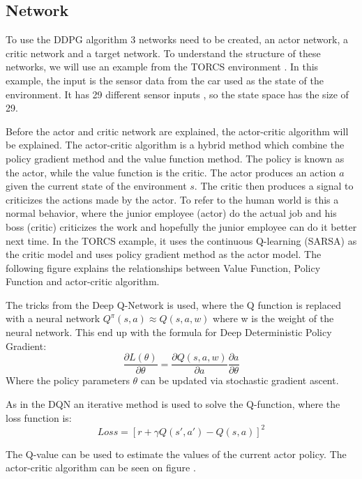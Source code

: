 \subsection{Network}
To use the DDPG algorithm 3 networks need to be created, an actor network, a critic network and a target network. To understand the structure of these networks, we will use an example from the TORCS environment \cite{DDPG_Torcs}. In this example, the input is the sensor data from the car used as the state of the environment. It has 29 different sensor inputs \cite{Data_from_Torcs}, so the state space has the size of 29.  

Before the actor and critic network are explained, the actor-critic algorithm will be explained. The actor-critic algorithm is a hybrid method which combine the policy gradient method and the value function method. The policy is known as the actor, while the value function is the critic. The actor produces an action $a$ given the current state of the environment $s$. The critic then produces a signal to criticizes the actions made by the actor. To refer to the human world is this a normal behavior, where the junior employee (actor) do the actual job and his boss (critic) criticizes the work and hopefully the junior employee can do it better next time. In the TORCS example, it uses the continuous Q-learning (SARSA) as the critic model and uses policy gradient method as the actor model. The following figure explains the relationships between Value Function, Policy Function and actor-critic algorithm.    

The tricks from the Deep Q-Network is used, where the Q function is replaced with a neural network $Q^\pi(s,a) \approx Q(s,a,w)$ where w is the weight of the neural network. This end up with the formula for Deep Deterministic Policy Gradient: 
\begin{equation}
\frac{\partial L(\theta)}{\partial \theta} =\frac{\partial Q(s,a,w)}{\partial a} \frac{\partial a}{\partial \theta}
\end{equation}
Where the policy parameters $\theta$ can be updated via stochastic gradient ascent.

As in the DQN an iterative method is used to solve the Q-function, where the loss function is:
\begin{equation}
Loss = [r + \gamma Q(s',a') - Q(s,a)]^2
\end{equation} 

The Q-value can be used to estimate the values of the current actor policy. The actor-critic algorithm can be seen on figure . 

